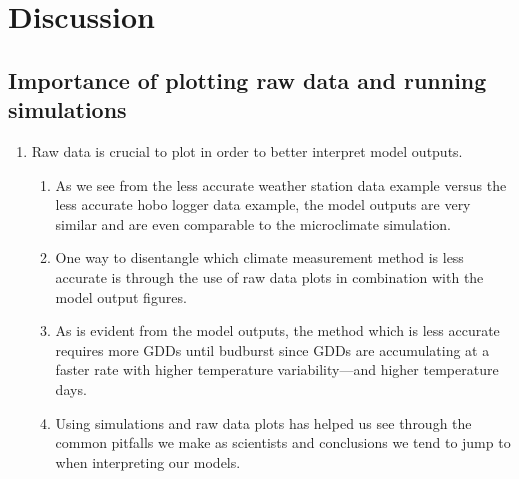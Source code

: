 \documentclass{article}\usepackage[]{graphicx}\usepackage[]{color}
\begin{document}
\section*{Discussion} 
\subsection*{Importance of plotting raw data and running simulations}
\begin{enumerate}
\item Raw data is crucial to plot in order to better interpret model outputs.
  \begin{enumerate}
  \item As we see from the less accurate weather station data example versus the less accurate hobo logger data example, the model outputs are very similar and are even comparable to the microclimate simulation.
  \item One way to disentangle which climate measurement method is less accurate is through the use of raw data plots in combination with the model output figures.
  \item As is evident from the model outputs, the method which is less accurate requires more GDDs until budburst since GDDs are accumulating at a faster rate with higher temperature variability---and higher temperature days.
  \item Using simulations and raw data plots has helped us see through the common pitfalls we make as scientists and conclusions we tend to jump to when interpreting our models. 
  \end{enumerate}
  

\end{enumerate}
\end{document}
